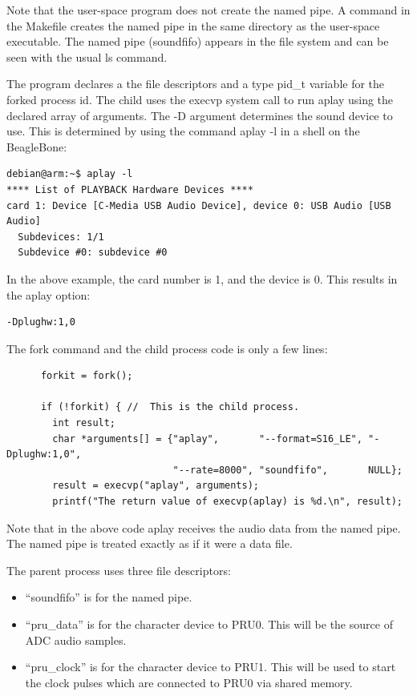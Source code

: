	Note that the user-space program does not create the named pipe.  A command in the Makefile creates the named pipe in the same directory as the user-space executable.  The named pipe (soundfifo) appears in the file system and can be seen with the usual ls command.
	
The program declares a the file descriptors and a type pid\_t variable for the forked process id.  The child uses the execvp system call to run aplay using the declared array of arguments.  The -D argument determines the sound device to use.  This is determined by using the command aplay -l in a shell on the BeagleBone:

\begin{verbatim}
debian@arm:~$ aplay -l
**** List of PLAYBACK Hardware Devices ****
card 1: Device [C-Media USB Audio Device], device 0: USB Audio [USB Audio]
  Subdevices: 1/1
  Subdevice #0: subdevice #0
\end{verbatim} 

In the above example, the card number is 1, and the device is 0.  This results
in the aplay option:

\begin{verbatim}
-Dplughw:1,0
\end{verbatim}
	
The fork command and the child process code is only a few lines:	
	
	\begin{verbatim}
	  forkit = fork();
	
	  if (!forkit) { //  This is the child process.
	    int result;
	    char *arguments[] = {"aplay",       "--format=S16_LE", "-Dplughw:1,0",
	                         "--rate=8000", "soundfifo",       NULL};
	    result = execvp("aplay", arguments);
	    printf("The return value of execvp(aplay) is %d.\n", result);
	\end{verbatim}
	
	Note that in the above code aplay receives the audio data from the named pipe.  The named pipe is treated exactly as if it were a data file.
		
		The parent process uses three file descriptors:
		
		\begin{itemize}
		\item ``soundfifo'' is for the named pipe.
		\item ``pru\_data'' is for the character device to PRU0.  This will be the source of ADC audio samples.
		\item ``pru\_clock'' is for the character device to PRU1.  This will be used to start the clock pulses which are connected to PRU0 via shared memory.
		\end{itemize}
	
